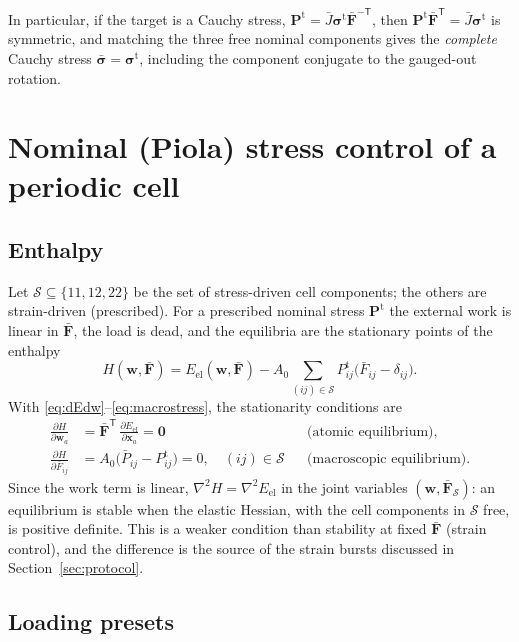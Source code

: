 \documentclass[11pt,a4paper]{article}
\newcommand{\Fb}{\bar{\mathbf F}}
\newcommand{\sigb}{\bar{\bm\sigma}}
\newcommand{\Pt}{\mathbf P^{\mathrm t}}
\newcommand{\sigt}{\bm\sigma^{\mathrm t}}
\newcommand{\x}{\mathbf x}
\newcommand{\w}{\mathbf w}
\begin{document}
In particular, if the target is a Cauchy stress, \(\Pt=\bar J\sigt\Fb^{-\mathsf T}\), then
\(\Pt\Fb^{\mathsf T}=\bar J\sigt\) is symmetric, and matching the three free nominal components
gives the \emph{complete} Cauchy stress \(\sigb=\sigt\), including the component conjugate to the
gauged-out rotation.

\section{Nominal (Piola) stress control of a periodic cell}
\label{sec:nominal}

\subsection{Enthalpy}

Let \(\mathcal S\subseteq\{11,12,22\}\) be the set of stress-driven cell components; the others
are strain-driven (prescribed). For a prescribed nominal stress \(\Pt\) the external work is linear
in \(\Fb\), the load is dead, and the equilibria are the stationary points of the enthalpy
\begin{equation}
  H(\w,\Fb)=E_{\mathrm{el}}(\w,\Fb)-A_0\sum_{(ij)\in\mathcal S}P^{\mathrm t}_{ij}
  \big(\bar F_{ij}-\delta_{ij}\big).
  \label{eq:H}
\end{equation}
With \eqref{eq:dEdw}--\eqref{eq:macrostress}, the stationarity conditions are
\begin{align}
  \frac{\partial H}{\partial\w_a}&=\Fb^{\mathsf T}\,\frac{\partial E_{\mathrm{el}}}{\partial\x_a}=\mathbf 0
  &&\text{(atomic equilibrium)},\label{eq:eqw}\\
  \frac{\partial H}{\partial\bar F_{ij}}&=A_0\big(\bar P_{ij}-P^{\mathrm t}_{ij}\big)=0,
  \quad (ij)\in\mathcal S &&\text{(macroscopic equilibrium)}.\label{eq:eqF}
\end{align}
Since the work term is linear, \(\nabla^2H=\nabla^2E_{\mathrm{el}}\) in the joint variables
\((\w,\Fb_{\mathcal S})\): an equilibrium is stable when the elastic Hessian, with the cell
components in \(\mathcal S\) free, is positive definite. This is a weaker condition than stability
at fixed \(\Fb\) (strain control), and the difference is the source of the strain bursts discussed
in Section~\ref{sec:protocol}.

\subsection{Loading presets}
\end{document}
